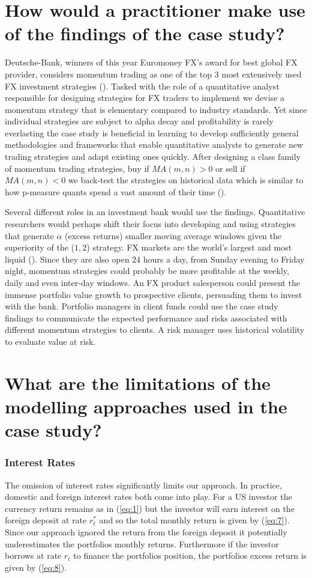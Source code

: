 \documentclass{article}
\begin{document}
\newpage\section*{How would a practitioner make use of the findings of the case study?}

Deutsche-Bank, winners of this year Euromoney FX's award for best global FX provider, considers momentum trading as one of the top 3 most extensively used FX investment strategies (\cite{EUROMONEY_2023,deutschebank_2009}). Tasked with the role of a quantitative analyst responsible for designing strategies for FX traders to implement we devise a momentum strategy that is elementary compared to industry standards. Yet since individual strategies are subject to alpha decay and profitability is rarely everlasting the case study is beneficial in learning to develop sufficiently general methodologies and frameworks that enable quantitative analysts to generate new trading strategies and adapt existing ones quickly. After designing a class family of momentum trading strategies, buy if $MA(m,n)>0$ or sell if $MA(m,n) < 0$ we back-test the strategies on historical data which is similar to how p-measure quants spend a vast amount of their time (\cite{efinancialCareers2023}).

Several different roles in an investment bank would use the findings. Quantitative researchers would perhaps shift their focus into developing and using strategies that generate $\alpha$ (excess returns) smaller moving average windows given the superiority of the ($1,2$) strategy. FX markets are the world's largest and most liquid (\cite{investopedia}). Since they are also open 24 hours a day, from Sunday evening to Friday night, momentum strategies could probably be more profitable at the weekly, daily and even inter-day windows. An FX product salesperson could present the immense portfolio value growth to prospective clients, persuading them to invest with the bank. Portfolio managers in client funds could use the case study findings to communicate the expected performance and risks associated with different momentum strategies to clients. A risk manager uses historical volatility to evaluate value at risk. 

\section*{What are the limitations of the modelling approaches used in the case study?}
\subsubsection*{Interest Rates}
The omission of interest rates significantly limits our approach. In practice, domestic and foreign interest rates both come into play. For a US investor the currency return remains as in (\ref{eq:1}) but the investor will earn interest on the foreign deposit at rate $r_{t}^{*}$ and so the total monthly return is given by (\ref{eq:7}). Since our approach ignored the return from the foreign deposit it potentially underestimates the portfolios monthly returns. Furthermore if the investor borrows at rate $r_{t}$ to finance the portfolios position, the portfolios excess return is given by (\ref{eq:8}).
\end{document}
